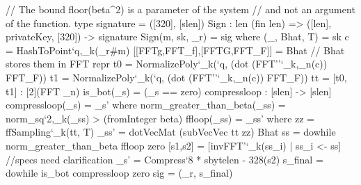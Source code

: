 
\begin{algorithm}[!htb]
	\caption{\sign(\msg, \sk, $\sqsignorm$)}\label{alg:sign}
	\begin{algorithmic}[1]
	\label{line:t}
	\Do\label{line:do}
	\Do
	\State{$\vecs = (\vect - \vecz)  \hat\matB$}
	\label{line:sqsig}
	\label{line:while}
	\end{algorithmic}
\end{algorithm}

\begin{code}
  // The bound floor(beta^2) is a parameter of the system
  // and not an argument of the function.
  type signature = ([320], [slen])
  Sign : {len} (fin len) => ([len], privateKey, [320]) -> signature
  Sign(m, sk, _r) = sig where
    (_, Bhat, T) = sk
    c = HashToPoint`{q,_k}(_r#m)
    [[FFTg,FFT_f],[FFTG,FFT_F]] = Bhat // Bhat stores them in FFT repr
    t0 = NormalizePoly`{_k}(`q, (dot (FFT''`{_k,_n}(c)) FFT_F))
    t1 = NormalizePoly`{_k}(`q, (dot (FFT''`{_k,_n}(c)) FFT_F))
    tt = [t0, t1] : [2](FFT _n)
    is_bot(_s) = (_s == zero)
    compressloop : [slen] -> [slen]
    compressloop(_s) = _s' where
      norm_greater_than_beta(_ss) = norm_sq`{2,_k}(_ss) > (fromInteger beta)
      ffloop(_ss) = _ss' where
        zz = ffSampling`{_k}(tt, T)
        _ss' = dotVecMat (subVecVec tt zz) Bhat
      ss = dowhile norm_greater_than_beta ffloop zero
      [s1,s2] = [invFFT'`{_k}(ss_i) | ss_i <- ss] //specs need clarification
      _s' = Compress`{8 * sbytelen - 328}(s2)
    s_final = dowhile is_bot compressloop zero
    sig = (_r, s_final)
\end{code}

